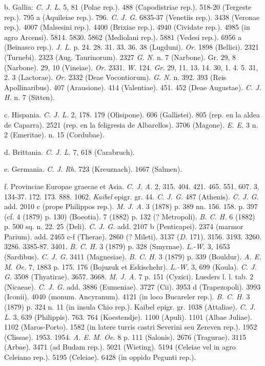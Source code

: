 \documentclass[a4paper, 11pt, oneside, polutonikogreek, german]{article}
\begin{document}
b. Gallia: \emph{C. J. L.} 5, 81 (Polae rep.). 488 (Capodistriae rep.). 518-20 (Tergeste rep.). 795 a (Aquileiae rep.). 796. \emph{C. J. G.} 6835-37 (Venetiis rep.). 3438 (Veronae rep.). 4007 (Malsesini rep.). 4400 (Brixiae rep.). 4940 (Cividate rep.). 4985 (in agro Arcensi). 5814. 5830. 5862 (Mediolani rep.). 5881 (Vedesi rep.). 6956 a (Beinasco rep.). \emph{J. L.} p. 24. 28. 31. 33. 36. 38 (Lugduni). \emph{Or.} 1898 (Bellici). 2321 (Turnebi). 2323 (Aug. Taurinorum). 2327 \emph{G. N.} n. 7 (Narbone). Gr. 29, 8 (Narbone). 29, 10 (Vineiae). \emph{Or.} 2331. \emph{W.} 124. \emph{Gr.} 29, 11. 13. 14. 30, 1. 4. 5. 31, 2. 3 (Lactorae). \emph{Or.} 2332 (Deae Vocontiorum). \emph{G. N.} n. 392. 393 (Reis Apollinaribus). 407 (Arausione). 414 (Valentiae). 451. 452 (Deae Augustae). \emph{C. J. H.} n. 7 (Sitten).

c. Hispania. \emph{C. J. L.} 2, 178. 179 (Olisipone). 606 (Gallistei). 805 (rep. en la aldea de Caparra). 2521 (rep. en la feligresia de Albarellos). 3706 (Magone). \emph{E. E.} 3 n. 2 (Emeritae). n. 15 (Cordubae).

d. Brittania. \emph{C. J. L.} 7, 618 (Carabruch).

e. Germania. \emph{C. J. Rh.} 723 (Kreuznach). 1667 (Salmen).

f. Provinciae Europae graecae et Asia. \emph{C. J. A.} 2, 315. 404. 421. 465. 551. 607. 3, 134-37. 172. 173. 888. 1062. \emph{Kaibel} epigr. gr. 44. \emph{C. J. G.} 487 (Athenis). \emph{C. J. G.} add. 2010 c (prope Philippos rep.). \emph{M. J. A.} 3 (1878) p. 389 nn. 156. 158. p. 397 (cf. 4 (1879) p. 130) (Boeotia). 7 (1882) p. 132 (? Metropoli). \emph{B. C. H.} 6 (1882) p. 500 sq. n. 22. 25 (Deli). \emph{C. J. G.} add. 2107 b (Penticapei). 2374 (marmor Parium). add. 2465 c-f (Therae). 2860 (? Mileti). 3137 (\emph{D.} 171). 3156. 3193. 3260. 3286. 3385-87. 3401. \emph{B. C. H.} 3 (1879) p. 328 (Smyrnae). \emph{L.-W.} 3, 1653 (Sardibus). \emph{C. J. G.} 3411 (Magnesiae). \emph{B. C. H.} 3 (1879) p. 339 (Bouldur). \emph{A. E. M. Oe.} 7, 1883 p. 175. 176 (Bojuzuk et Eskischehr). \emph{L.-W.} 3, 699 (Koula). \emph{C. J. G.} 3508 (Thyatirae). 3657. 3668. \emph{M. J. A.} 7 p. 151 (Cyzici). Lueders l. l. tab. 2 (Nicaeae). \emph{C. J. G.} add. 3886 (Eumeniae). 3727 (Cii). 3953 d (Trapezopoli). 3993 (Iconii). 4040 (monum. Ancyranum). 4121 (in loco Bucareler rep.). \emph{B. C. H.} 3 (1879) p. 324 n. 11 (in insula Chio rep.). Kaibel epigr. gr. 1038 (Attaliae). \emph{C. J. L.} 3, 639 (Philippis). 763. 764 (Koestendje). 1100 (Apuli). 1101 (Albae Juliae). 1102 (Maros-Porto). 1582 (in latere turris castri Severini seu Zereven rep.). 1952 (Clissae). 1953. 1954. \emph{A. E. M. Oe.} 8 p. 111 (Salonis). 2676 (Tragurae). 3115 (Arbae). 3471 (ad Budam rep.). 5021 (Wieting). 5194 (Celeiae vel in agro Celeiano rep.). 5195 (Celeiae). 6428 (in oppido Pegunti rep.).
\end{document}
